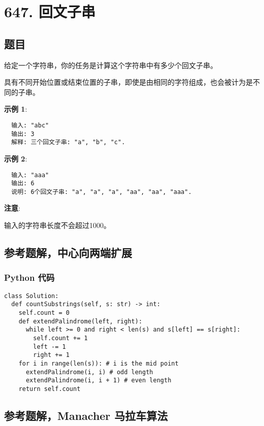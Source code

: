 \newpage
\section{647. 回文子串}
\label{leetcode:647}

\subsection{题目}

给定一个字符串，你的任务是计算这个字符串中有多少个回文子串。

具有不同开始位置或结束位置的子串，即使是由相同的字符组成，也会被计为是不同的子串。

\textbf{示例 1}:

\begin{verbatim}
  输入: "abc"
  输出: 3
  解释: 三个回文子串: "a", "b", "c".
\end{verbatim}

\textbf{示例 2}:

\begin{verbatim}
  输入: "aaa"
  输出: 6
  说明: 6个回文子串: "a", "a", "a", "aa", "aa", "aaa".
\end{verbatim}

\textbf{注意}:

输入的字符串长度不会超过1000。

\subsection{参考题解，中心向两端扩展}

\subsubsection{Python 代码}

\begin{verbatim}
class Solution:
  def countSubstrings(self, s: str) -> int:
    self.count = 0
    def extendPalindrome(left, right):
      while left >= 0 and right < len(s) and s[left] == s[right]:
        self.count += 1
        left -= 1
        right += 1
    for i in range(len(s)): # i is the mid point
      extendPalindrome(i, i) # odd length
      extendPalindrome(i, i + 1) # even length
    return self.count
\end{verbatim}

\subsection{参考题解，Manacher 马拉车算法}

